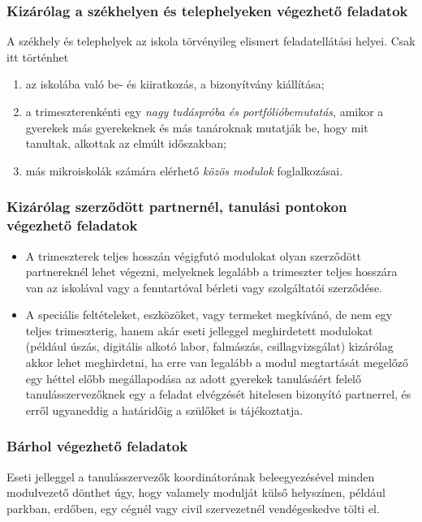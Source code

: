 \subsubsection{Kizárólag a székhelyen és telephelyeken végezhető feladatok}
A székhely és telephelyek az iskola törvényileg elismert feladatellátási helyei. Csak itt történhet
\begin{enumerate}
    \item az iskolába való be- és kiiratkozás, a bizonyítvány kiállítása;
    \item a trimeszterenkénti egy \emph{nagy tudáspróba és portfólióbemutatás}, amikor a gyerekek más gyerekeknek és más tanároknak mutatják be, hogy mit tanultak, alkottak az elmúlt időszakban;
    \item  más mikroiskolák számára elérhető \emph{közös modulok} foglalkozásai.
\end{enumerate}

\subsubsection{Kizárólag szerződött partnernél, tanulási pontokon végezhető feladatok}
\begin{itemize}
    \item A trimeszterek teljes hosszán végigfutó modulokat olyan szerződött partnereknél lehet végezni, melyeknek legalább a trimeszter teljes hosszára van az iskolával vagy a fenntartóval bérleti vagy szolgáltatói szerződése.
    \item A speciális feltételeket, eszközöket, vagy termeket megkívánó, de nem egy teljes trimeszterig, hanem akár eseti jelleggel meghirdetett modulokat (például úszás, digitális alkotó labor, falmászás, csillagvizsgálat) kizárólag akkor lehet meghirdetni, ha erre van legalább a modul megtartását megelőző egy héttel előbb megállapodása az adott gyerekek tanulásáért felelő tanulásszervezőknek egy a feladat elvégzését hitelesen bizonyító partnerrel, és erről ugyaneddig a határidőig a szülőket is tájékoztatja.
\end{itemize}

\subsubsection{Bárhol végezhető feladatok}

Eseti jelleggel a tanulásszervezők koordinátorának beleegyezésével minden modulvezető dönthet úgy, hogy valamely modulját külső helyszínen, például parkban, erdőben, egy cégnél vagy civil szervezetnél vendégeskedve tölti el.

